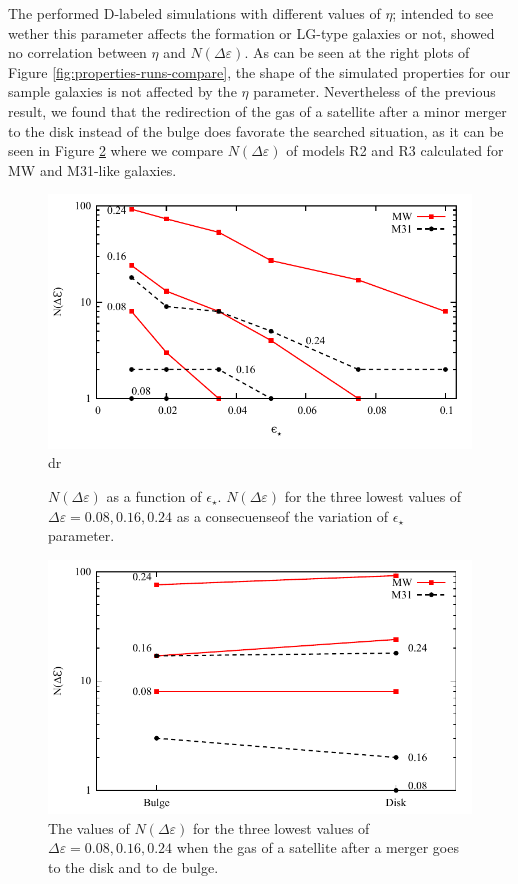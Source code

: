 \documentclass[usenatbib]{mn2e}
\begin{document}
The performed D-labeled simulations with different values of  $\eta$; intended to see wether this parameter affects the formation or LG-type galaxies or not,
showed no correlation between $\eta$ and $N(\Delta\varepsilon)$. As can be seen at the right plots of Figure \ref{fig:properties-runs-compare}, the shape of the
 simulated properties for our sample galaxies is not affected by the $\eta$ parameter. Nevertheless of the previous result, we found that the 
redirection of the gas of a satellite after  a minor merger to the disk instead of the bulge does favorate the searched situation, as it can be seen in Figure
 \ref{fig:lg-chi-gas-moves-to} where we compare $N(\Delta\varepsilon)$ of models R2 and R3 calculated for MW and M31-like galaxies.

\begin{figure}
\centering
 \includegraphics[scale=0.68]{figures/chi-parameters/chi-squared-star-form-eff-v2.pdf}dr
\caption{$N(\Delta\varepsilon)$ as a function of $\epsilon_{\star}$. $N(\Delta\varepsilon)$ for the three lowest values of $\Delta\varepsilon=0.08,0.16,0.24$ 
as a consecuenseof the variation of $\epsilon_{\star}$ parameter. \label{fig:lg-chi-disk-star-eff}}
\end{figure}


\begin{figure}
\centering
 \includegraphics[scale=0.68]{figures/chi-parameters/chi-squared-merger-ratio-v2.pdf}
\caption{The values of $N(\Delta\varepsilon)$  for the three lowest values of $\Delta\varepsilon=0.08,0.16,0.24$ when the gas of a satellite after a merger goes to the 
disk and to de bulge. \label{fig:lg-chi-gas-moves-to}}
\end{figure}
\end{document}
